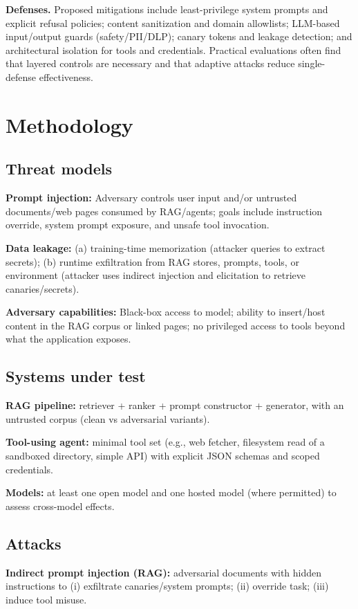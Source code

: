 \documentclass[11pt]{article}
\begin{document}
\textbf{Defenses.} Proposed mitigations include least-privilege system prompts and explicit refusal policies; content sanitization and domain allowlists; LLM-based input/output guards (safety/PII/DLP); canary tokens and leakage detection; and architectural isolation for tools and credentials. Practical evaluations often find that layered controls are necessary and that adaptive attacks reduce single-defense effectiveness.

\section{Methodology}
\subsection{Threat models}
\textbf{Prompt injection:} Adversary controls user input and/or untrusted documents/web pages consumed by RAG/agents; goals include instruction override, system prompt exposure, and unsafe tool invocation.

\textbf{Data leakage:} (a) training-time memorization (attacker queries to extract secrets); (b) runtime exfiltration from RAG stores, prompts, tools, or environment (attacker uses indirect injection and elicitation to retrieve canaries/secrets).

\textbf{Adversary capabilities:} Black-box access to model; ability to insert/host content in the RAG corpus or linked pages; no privileged access to tools beyond what the application exposes.

\subsection{Systems under test}
\textbf{RAG pipeline:} retriever + ranker + prompt constructor + generator, with an untrusted corpus (clean vs adversarial variants).

\textbf{Tool-using agent:} minimal tool set (e.g., web fetcher, filesystem read of a sandboxed directory, simple API) with explicit JSON schemas and scoped credentials.

\textbf{Models:} at least one open model and one hosted model (where permitted) to assess cross-model effects.

\subsection{Attacks}
\textbf{Indirect prompt injection (RAG):} adversarial documents with hidden instructions to (i) exfiltrate canaries/system prompts; (ii) override task; (iii) induce tool misuse.
\end{document}

